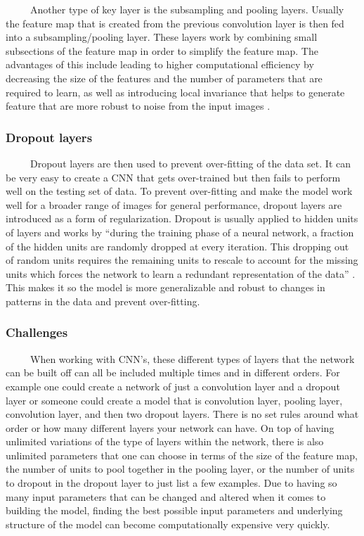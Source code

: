 \documentclass[12pt]{article}
\begin{document}
~~~~~Another type of key layer is the subsampling and pooling layers.
Usually the feature map that is created from the previous convolution
layer is then fed into a subsampling/pooling layer. These layers work by
combining small subsections of the feature map in order to simplify the
feature map. The advantages of this include leading to higher
computational efficiency by decreasing the size of the features and the
number of parameters that are required to learn, as well as introducing
local invariance that helps to generate feature that are more robust to
noise from the input images \citet{Mathworks}.

\hypertarget{dropout-layers}{%
\subsubsection{Dropout layers}\label{dropout-layers}}

~~~~~Dropout layers are then used to prevent over-fitting of the data
set. It can be very easy to create a CNN that gets over-trained but then
fails to perform well on the testing set of data. To prevent
over-fitting and make the model work well for a broader range of images
for general performance, dropout layers are introduced as a form of
regularization. Dropout is usually applied to hidden units of layers and
works by ``during the training phase of a neural network, a fraction of
the hidden units are randomly dropped at every iteration. This dropping
out of random units requires the remaining units to rescale to account
for the missing units which forces the network to learn a redundant
representation of the data'' \citet{PML}. This makes it so the model is
more generalizable and robust to changes in patterns in the data and
prevent over-fitting.

\hypertarget{challenges}{%
\subsubsection{Challenges}\label{challenges}}

~~~~~When working with CNN's, these different types of layers that the
network can be built off can all be included multiple times and in
different orders. For example one could create a network of just a
convolution layer and a dropout layer or someone could create a model
that is convolution layer, pooling layer, convolution layer, and then
two dropout layers. There is no set rules around what order or how many
different layers your network can have. On top of having unlimited
variations of the type of layers within the network, there is also
unlimited parameters that one can choose in terms of the size of the
feature map, the number of units to pool together in the pooling layer,
or the number of units to dropout in the dropout layer to just list a
few examples. Due to having so many input parameters that can be changed
and altered when it comes to building the model, finding the best
possible input parameters and underlying structure of the model can
become computationally expensive very quickly.
\end{document}
